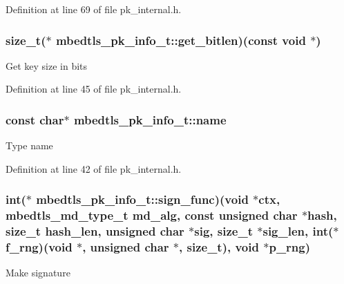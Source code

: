 Definition at line 69 of file pk\-\_\-internal.\-h.

\hypertarget{structmbedtls__pk__info__t_a6bba14dc93e95a56df97a5c9cfbbc972}{
\subsubsection[{get\-\_\-bitlen}]{\setlength{\rightskip}{0pt plus 5cm}size\-\_\-t($\ast$ mbedtls\-\_\-pk\-\_\-info\-\_\-t\-::get\-\_\-bitlen)(const void $\ast$)}}\label{structmbedtls__pk__info__t_a6bba14dc93e95a56df97a5c9cfbbc972}
Get key size in bits 

Definition at line 45 of file pk\-\_\-internal.\-h.

\hypertarget{structmbedtls__pk__info__t_a6390c0e7c7597efec2033fcbea53697c}{
\subsubsection[{name}]{\setlength{\rightskip}{0pt plus 5cm}const char$\ast$ mbedtls\-\_\-pk\-\_\-info\-\_\-t\-::name}}\label{structmbedtls__pk__info__t_a6390c0e7c7597efec2033fcbea53697c}
Type name 

Definition at line 42 of file pk\-\_\-internal.\-h.

\hypertarget{structmbedtls__pk__info__t_a84319d0e361748b3603d49ccabc39e54}{
\subsubsection[{sign\-\_\-func}]{\setlength{\rightskip}{0pt plus 5cm}int($\ast$ mbedtls\-\_\-pk\-\_\-info\-\_\-t\-::sign\-\_\-func)(void $\ast$ctx, mbedtls\-\_\-md\-\_\-type\-\_\-t md\-\_\-alg, const unsigned char $\ast$hash, size\-\_\-t hash\-\_\-len, unsigned char $\ast$sig, size\-\_\-t $\ast$sig\-\_\-len, int($\ast$f\-\_\-rng)(void $\ast$, unsigned char $\ast$, size\-\_\-t), void $\ast$p\-\_\-rng)}}\label{structmbedtls__pk__info__t_a84319d0e361748b3603d49ccabc39e54}
Make signature 

